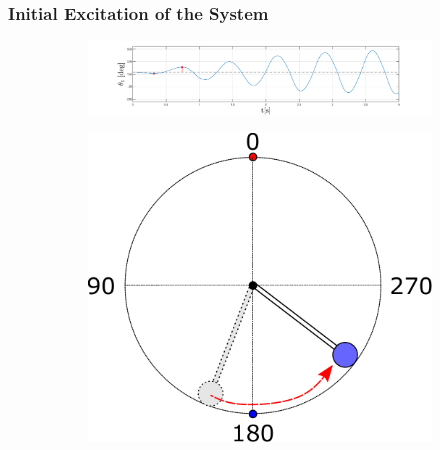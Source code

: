 \documentclass[]{beamer}
\begin{document}
\begin{frame}
	\frametitle{Initial Excitation of the System}
	\begin{figure}[H]
		\centering
		\begin{subfigure}
			\centering
			\includegraphics[scale=0.25]{images/swings2/swing3.pdf}  
		\end{subfigure}
		\begin{subfigure}
			\centering
			\includegraphics[scale=0.25]{images/swing2.pdf}  
		\end{subfigure}
	\end{figure}
\end{frame}
\end{document}
